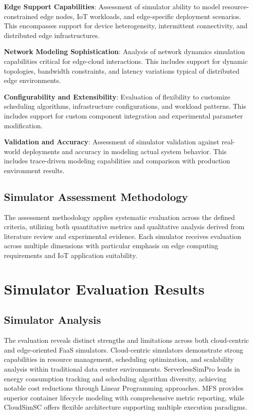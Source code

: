 \textbf{Edge Support Capabilities}: Assessment of simulator ability to model resource-constrained edge nodes, IoT workloads, and edge-specific deployment scenarios. This encompasses support for device heterogeneity, intermittent connectivity, and distributed edge infrastructures.

\textbf{Network Modeling Sophistication}: Analysis of network dynamics simulation capabilities critical for edge-cloud interactions. This includes support for dynamic topologies, bandwidth constraints, and latency variations typical of distributed edge environments.

\textbf{Configurability and Extensibility}: Evaluation of flexibility to customize scheduling algorithms, infrastructure configurations, and workload patterns. This includes support for custom component integration and experimental parameter modification.

\textbf{Validation and Accuracy}: Assessment of simulator validation against real-world deployments and accuracy in modeling actual system behavior. This includes trace-driven modeling capabilities and comparison with production environment results.

\subsection{Simulator Assessment Methodology}

The assessment methodology applies systematic evaluation across the defined criteria, utilizing both quantitative metrics and qualitative analysis derived from literature review and experimental evidence. Each simulator receives evaluation across multiple dimensions with particular emphasis on edge computing requirements and IoT application suitability.

\section{Simulator Evaluation Results}

\subsection{Simulator Analysis}

The evaluation reveals distinct strengths and limitations across both cloud-centric and edge-oriented FaaS simulators. Cloud-centric simulators demonstrate strong capabilities in resource management, scheduling optimization, and scalability analysis within traditional data center environments. ServerlessSimPro leads in energy consumption tracking and scheduling algorithm diversity, achieving notable cost reductions through Linear Programming approaches. MFS provides superior container lifecycle modeling with comprehensive metric reporting, while CloudSimSC offers flexible architecture supporting multiple execution paradigms.

